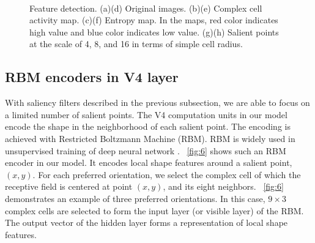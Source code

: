 \documentclass[twocolumn]{article}
\begin{document}
\begin{figure}[!t]
\\
\hfil
{}
\caption{Feature detection. (a)(d) Original images.
(b)(e) Complex cell activity map. 
(c)(f) Entropy map.
In the maps, red color indicates high value and blue color indicates low value.
(g)(h) Salient points at the scale of 4, 8, and 16 in terms of simple cell radius.}
\label{fig:5}
\end{figure}

\subsection{RBM encoders in V4 layer}

With saliency filters described in the previous subsection, we are able to focus on a limited number of salient points.
The V4 computation units in our model encode the shape in the neighborhood of each salient point.
The encoding is achieved with Restricted Boltzmann Machine (RBM).
RBM is widely used in unsupervised training of deep neural network \cite{bengio2009}.
\figurename~\ref{fig:6} shows such an RBM encoder in our model.
It encodes local shape features around a salient point, $(x,y)$.
For each preferred orientation, we select the complex cell of which the receptive field is centered at point $(x,y)$, and its eight neighbors.
\figurename~\ref{fig:6} demonstrates an example of three preferred orientations.
In this case, $9\times3$ complex cells are selected to form the input layer (or visible layer) of the RBM.
The output vector of the hidden layer forms a representation of local shape features.
\end{document}
